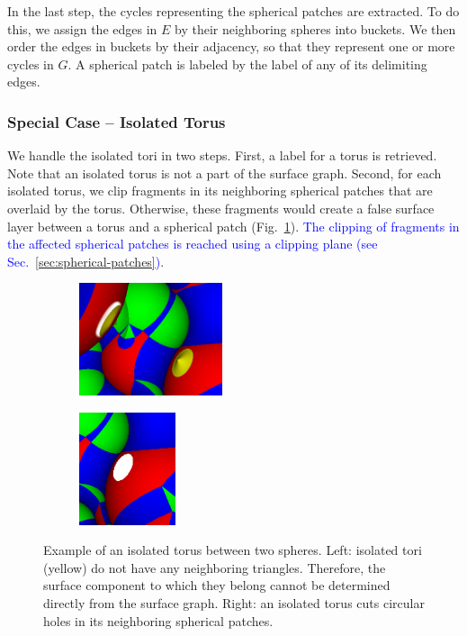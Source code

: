 In the last step, the cycles representing the spherical patches are extracted.
To do this, we assign the edges in $E$ by their neighboring spheres into buckets.
We then order the edges in buckets by their adjacency, so that they represent one or more cycles in $G$.
A spherical patch is labeled by the label of any of its delimiting edges.

\subsubsection{Special Case -- Isolated Torus}
\label{sec:isolated}

We handle the isolated tori in two steps.
First, a label for a torus is retrieved. 
Note that an isolated torus is not a part of the surface graph.
Second, for each isolated torus, we clip fragments in its neighboring spherical patches that are overlaid by the torus. 
Otherwise, these fragments would create a false surface layer between a torus and a spherical patch (Fig.~\ref{fig:isolated-hole}).
\textcolor{blue}{The clipping of fragments in the affected spherical patches is reached using a clipping plane (see Sec.~\ref{sec:spherical-patches})}.

\begin{figure}[htp]
  \centering
  \begin{subfigure}[t]{0.55\columnwidth}
    \centering
    \includegraphics[height=1.3in]{image/isolated-cutaway2.png}
  \end{subfigure}%
  \quad
  \begin{subfigure}[t]{0.4\columnwidth}
    \centering
    \includegraphics[height=1.3in]{image/isolated-hole.png}
  \end{subfigure}
\caption{Example of an isolated torus between two spheres.
	Left: isolated tori (yellow) do not have any neighboring triangles. Therefore, the surface component to which they belong cannot be determined directly from the surface graph. Right: an isolated torus cuts circular holes in its neighboring spherical patches.}
\label{fig:isolated-hole}
\end{figure}

